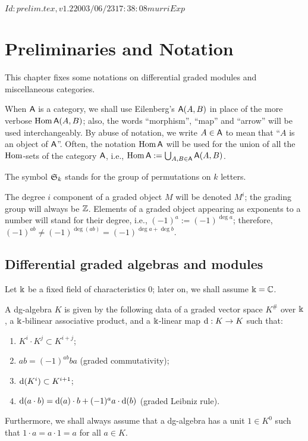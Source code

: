 \RCSID $Id: prelim.tex,v 1.2 2003/06/23 17:38:08 murri Exp $


\chapter{Preliminaries and Notation}

This chapter fixes some notations on differential graded modules
and miscellaneous categories. 

When $\mathsf{A}$ is a category, we shall use Eilenberg's $\mathsf{A}(A, B)$ in place
of the more verbose $\operatorname{Hom} \mathsf{A}(A, B)$; also, the words ``morphism'',
``map'' and ``arrow'' will be used interchangeably. By abuse of
notation, we write $A \in \mathsf{A}$ to mean that ``$A$ is an object of
$\mathsf{A}$''. Often, the notation $\operatorname{Hom}\mathsf{A}$ will be used for the union of all
the $\operatorname{Hom}$-sets of the category $\mathsf{A}$, i.e., $\operatorname{Hom}\mathsf{A} := \bigcup_{A,B \in \mathsf{A}}
\mathsf{A}(A,B)$.

The symbol $\mathfrak{S}_{k}$ stands for the group of permutations on $k$
letters.

The degree $i$ component of a graded object $M$ will be denoted
$M^i$; the grading group will always be $\mathbb{Z}$. Elements of a graded
object appearing as exponents to a number will stand for their degree,
i.e., $(-1)^a := (-1)^{\deg a}$; therefore, $(-1)^{ab} \not=
(-1)^{\deg (ab)} = (-1)^{\deg a + \deg b}$.


\section{Differential graded algebras and modules}
\label{sec:dg-things}

Let $\Bbbk$ be a fixed field of characteristics $0$; later on, we shall
assume $\Bbbk = \mathbb{C}$.
\begin{definition}
  A dg-algebra $K$ is given by the following data of a graded vector
  space $K^\#$ over $\Bbbk$, a $\Bbbk$-bilinear associative product, and a
  $\Bbbk$-linear map $\mathrm{d}: K\to K$ such that:
  \begin{enumerate}
  \item $K^i \cdot K^j \subset K^{i+j}$;
  \item $ab = (-1)^{ab} ba$ (graded commutativity);
  \item $\mathrm{d}(K^i) \subset K^{i+1}$;
  \item $\mathrm{d}(a\cdot b) = \mathrm{d}(a)\cdot b + (-1)^a a\cdot\mathrm{d}(b)$ (graded Leibniz rule).
  \end{enumerate}
  Furthermore, we shall always assume that a dg-algebra has a unit
  $1\in K^0$ such that $1\cdot a = a\cdot 1 = a$ for all $a\in
  K$.
\end{definition}

